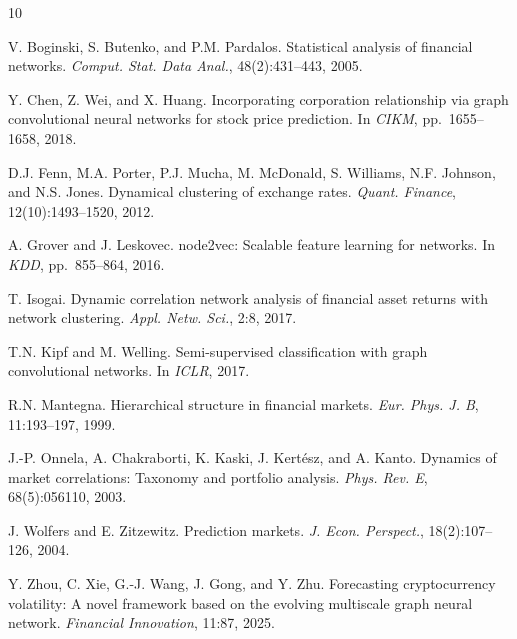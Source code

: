 \documentclass{article} %
\begin{document}
\begin{thebibliography}{10}

 V. Boginski, S. Butenko, and P.M. Pardalos. Statistical analysis of financial networks. \textit{Comput. Stat. Data Anal.}, 48(2):431--443, 2005.

 Y. Chen, Z. Wei, and X. Huang. Incorporating corporation relationship via graph convolutional neural networks for stock price prediction. In \textit{CIKM}, pp.\ 1655--1658, 2018.

 D.J. Fenn, M.A. Porter, P.J. Mucha, M. McDonald, S. Williams, N.F. Johnson, and N.S. Jones. Dynamical clustering of exchange rates. \textit{Quant. Finance}, 12(10):1493--1520, 2012.

 A. Grover and J. Leskovec. node2vec: Scalable feature learning for networks. In \textit{KDD}, pp.\ 855--864, 2016.

 T. Isogai. Dynamic correlation network analysis of financial asset returns with network clustering. \textit{Appl. Netw. Sci.}, 2:8, 2017.

 T.N. Kipf and M. Welling. Semi-supervised classification with graph convolutional networks. In \textit{ICLR}, 2017.

 R.N. Mantegna. Hierarchical structure in financial markets. \textit{Eur. Phys. J. B}, 11:193--197, 1999.

 J.-P. Onnela, A. Chakraborti, K. Kaski, J. Kert\'{e}sz, and A. Kanto. Dynamics of market correlations: Taxonomy and portfolio analysis. \textit{Phys. Rev. E}, 68(5):056110, 2003.

 J. Wolfers and E. Zitzewitz. Prediction markets. \textit{J. Econ. Perspect.}, 18(2):107--126, 2004.

 Y. Zhou, C. Xie, G.-J. Wang, J. Gong, and Y. Zhu. Forecasting cryptocurrency volatility: A novel framework based on the evolving multiscale graph neural network. \textit{Financial Innovation}, 11:87, 2025.

\end{thebibliography}
\end{document}
